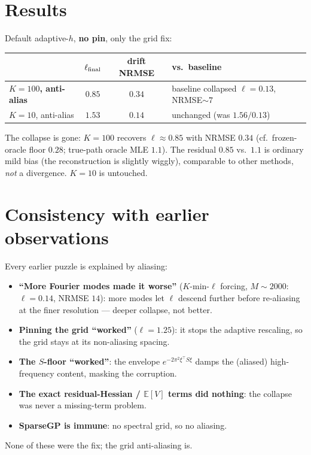 \documentclass[11pt]{article}
\newcommand{\E}{\mathbb{E}}
\begin{document}
\section{Results}
Default adaptive-$h$, \textbf{no pin}, only the grid fix:
\begin{center}\small
\begin{tabular}{@{}lccl@{}}
\toprule
 & $\ell_{\rm final}$ & drift NRMSE & vs.\ baseline \\
\midrule
\textbf{$K{=}100$, anti-alias} & $\mathbf{0.85}$ & $\mathbf{0.34}$ & baseline collapsed $\ell{=}0.13$, NRMSE${\sim}7$ \\
$K{=}10$, anti-alias           & $1.53$          & $0.14$          & unchanged (was $1.56/0.13$) \\
\bottomrule
\end{tabular}
\end{center}
The collapse is gone: $K{=}100$ recovers $\ell{\approx}0.85$ with NRMSE $0.34$
(cf.\ frozen-oracle floor $0.28$; true-path oracle MLE $1.1$). The residual
$0.85$ vs.\ $1.1$ is ordinary mild bias (the reconstruction is slightly wiggly),
comparable to other methods, \emph{not} a divergence. $K{=}10$ is untouched.

\section{Consistency with earlier observations}
Every earlier puzzle is explained by aliasing:
\begin{itemize}\itemsep2pt
\item \textbf{``More Fourier modes made it worse''} ($K$-min-$\ell$ forcing,
$M{\sim}2000$: $\ell{=}0.14$, NRMSE $14$): more modes let $\ell$ descend further
before re-aliasing at the finer resolution --- deeper collapse, not better.
\item \textbf{Pinning the grid ``worked''} ($\ell{=}1.25$): it stops the
adaptive rescaling, so the grid stays at its non-aliasing spacing.
\item \textbf{The $S$-floor ``worked''}: the envelope $e^{-2\pi^2\xi^\top S\xi}$
damps the (aliased) high-frequency content, masking the corruption.
\item \textbf{The exact residual-Hessian / $\E[V]$ terms did nothing}: the
collapse was never a missing-term problem.
\item \textbf{SparseGP is immune}: no spectral grid, so no aliasing.
\end{itemize}
None of these were the fix; the grid anti-aliasing is.
\end{document}

